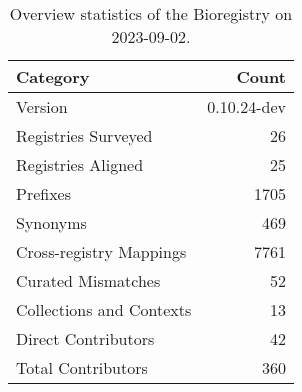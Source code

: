 \begin{table}
\caption{Overview statistics of the Bioregistry on 2023-09-02.}
\label{tab:bioregistry-summary}
\begin{tabular}{lr}
\toprule
Category & Count \\
\midrule
Version & 0.10.24-dev \\
Registries Surveyed & 26 \\
Registries Aligned & 25 \\
Prefixes & 1705 \\
Synonyms & 469 \\
Cross-registry Mappings & 7761 \\
Curated Mismatches & 52 \\
Collections and Contexts & 13 \\
Direct Contributors & 42 \\
Total Contributors & 360 \\
\bottomrule
\end{tabular}
\end{table}
